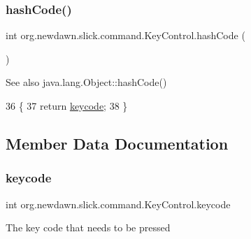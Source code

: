 \subsubsection{\texorpdfstring{hash\+Code()}{hashCode()}}
{\footnotesize\ttfamily int org.\+newdawn.\+slick.\+command.\+Key\+Control.\+hash\+Code (\begin{DoxyParamCaption}{ }\end{DoxyParamCaption})\hspace{0.3cm}{\ttfamily [inline]}}

\begin{DoxySeeAlso}{See also}
java.\+lang.\+Object\+::hash\+Code() 
\end{DoxySeeAlso}

\begin{DoxyCode}
36                           \{
37         \textcolor{keywordflow}{return} \mbox{\hyperlink{classorg_1_1newdawn_1_1slick_1_1command_1_1_key_control_ad8edd8c70be8e811bbc7049f9fea0746}{keycode}};
38     \}
\end{DoxyCode}


\subsection{Member Data Documentation}
\mbox{\label{classorg_1_1newdawn_1_1slick_1_1command_1_1_key_control_ad8edd8c70be8e811bbc7049f9fea0746}} 
\subsubsection{\texorpdfstring{keycode}{keycode}}
{\footnotesize\ttfamily int org.\+newdawn.\+slick.\+command.\+Key\+Control.\+keycode\hspace{0.3cm}{\ttfamily [private]}}

The key code that needs to be pressed 